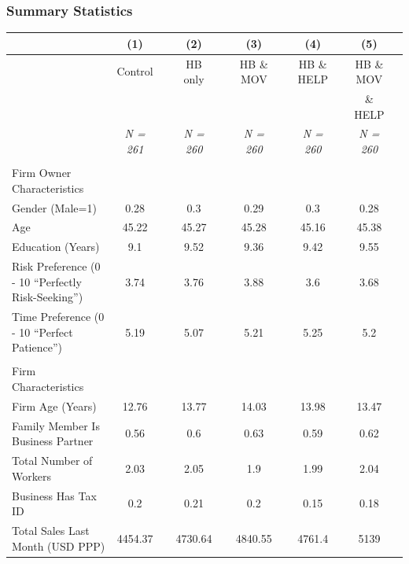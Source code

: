 \documentclass[hideothersubsections, usenames,dvipsnames,11pt]{beamer}
\begin{document}
\begin{frame}
\frametitle{Summary Statistics}



{\tiny{
	\begin{table}
		\centering	
		\tabcolsep=0.1cm
		\fontsize{5.2}{5.2}\selectfont

			\begin{tabular}{l*{10}{c}}
			\hline
			& (1)  &&(2) && (3)  &&(4) && (5) \\
			\hline


&\multicolumn{1}{c}{\textcolor{bdf}{Control}}
&&\multicolumn{1}{c}{\textcolor{bdf}{HB only}}	
&&\multicolumn{1}{c}{\textcolor{bdf}{HB \& MOV}	}
&&\multicolumn{1}{c}{\textcolor{bdf}{HB \& HELP}}	
&&\multicolumn{1}{c}{\textcolor{bdf}{HB \& MOV}}	\\


&\multicolumn{1}{c}{}
&&\multicolumn{1}{c}{}	
&&\multicolumn{1}{c}{}
&&\multicolumn{1}{c}{}	
&&\multicolumn{1}{c}{\textcolor{bdf}{\& HELP}}	\\


&\textit{N = 261}	
&&\textit{N = 260}	
&&\textit{N = 260}	
&&\textit{N = 260}	
&&\textit{N = 260}	\\
\hline \\

\textcolor{bdf}{Firm Owner Characteristics} \\
Gender (Male=1)											& 0.28	&& 0.3	&&0.29	&& 0.3	&& 0.28\\
Age														&45.22	&&45.27	&&45.28	&&45.16	&&45.38 \\
Education (Years)										&9.1	&&9.52	&&9.36	&&9.42	&&9.55 \\
Risk Preference (0 - 10 ``Perfectly Risk-Seeking'')		&3.74	&&3.76	&&3.88	&&3.6	&&3.68 \\											
Time Preference	(0 - 10 ``Perfect Patience'')			&5.19	&&5.07	&&5.21	&&5.25	&&5.2 \\[0.5ex]
\\														
\textcolor{bdf}{Firm Characteristics} \\
Firm Age (Years)										&12.76		&&13.77		&&14.03		&&13.98		&&13.47 \\
Family Member Is Business Partner							&0.56		&&0.6		&&0.63		&&0.59		&&0.62 \\
Total Number of Workers									&2.03		&&2.05		&&1.9		&&1.99		&&2.04 \\
Business Has Tax ID										&0.2		&&0.21		&&0.2		&&0.15		&&0.18 \\
Total Sales Last Month (USD PPP)						&4454.37 &&	4730.64	&& 4840.55	&& 4761.4	&& 5139 \\
												

\end{tabular}
\end{table}}}
\end{frame}
\end{document}
